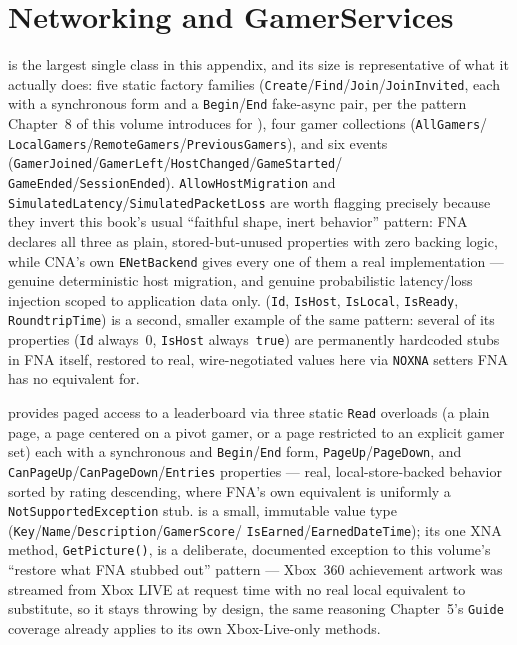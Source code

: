 \section{Networking and GamerServices}
\label{sec:api-net-gamerservices}

 is the largest single class in this appendix, and its size is
representative of what it actually does: five static factory families
(\texttt{Create}/\texttt{Find}/\texttt{Join}/\texttt{JoinInvited}, each with a synchronous form
and a \texttt{Begin}/\texttt{End} fake-async pair, per the pattern Chapter~8 of this volume
introduces for ), four gamer collections (\texttt{AllGamers}/%
\texttt{LocalGamers}/\texttt{RemoteGamers}/\texttt{PreviousGamers}), and six events
(\texttt{GamerJoined}/\texttt{GamerLeft}/\texttt{HostChanged}/\texttt{GameStarted}/%
\texttt{GameEnded}/\texttt{SessionEnded}). \texttt{AllowHostMigration} and
\texttt{SimulatedLatency}/\texttt{SimulatedPacketLoss} are worth flagging precisely because they
invert this book's usual ``faithful shape, inert behavior'' pattern: FNA declares all three as
plain, stored-but-unused properties with zero backing logic, while CNA's own \texttt{ENetBackend}
gives every one of them a real implementation --- genuine deterministic host migration, and
genuine probabilistic latency/loss injection scoped to application data only. 
(\texttt{Id}, \texttt{IsHost}, \texttt{IsLocal}, \texttt{IsReady}, \texttt{RoundtripTime}) is a
second, smaller example of the same pattern: several of its properties (\texttt{Id} always~0,
\texttt{IsHost} always~\texttt{true}) are permanently hardcoded stubs in FNA itself, restored to
real, wire-negotiated values here via \texttt{NOXNA} setters FNA has no equivalent for.

 provides paged access to a leaderboard via three static
\texttt{Read} overloads (a plain page, a page centered on a pivot gamer, or a page restricted to
an explicit gamer set) each with a synchronous and \texttt{Begin}/\texttt{End} form,
\texttt{PageUp}/\texttt{PageDown}, and \texttt{CanPageUp}/\texttt{CanPageDown}/\texttt{Entries}
properties --- real, local-store-backed behavior sorted by rating descending, where FNA's own
equivalent is uniformly a \texttt{NotSupportedException} stub.  is a small,
immutable value type (\texttt{Key}/\texttt{Name}/\texttt{Description}/\texttt{GamerScore}/%
\texttt{IsEarned}/\texttt{EarnedDateTime}); its one XNA method, \texttt{GetPicture()}, is a
deliberate, documented exception to this volume's ``restore what FNA stubbed out'' pattern ---
Xbox~360 achievement artwork was streamed from Xbox LIVE at request time with no real local
equivalent to substitute, so it stays throwing by design, the same reasoning Chapter~5's
\texttt{Guide} coverage already applies to its own Xbox-Live-only methods.


